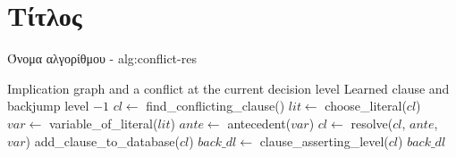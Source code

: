 \section{Τίτλος}

\begin{myalgorithm}{Όνομα αλγορίθμου - }{alg:conflict-res}
\begin{algorithmic}[1]
    \Require Implication graph and a conflict at the current decision level
    \Ensure Learned clause and backjump level
            \State \Return $-1$
        \EndIf
        \State $cl \gets$ find\_conflicting\_clause()
            \State $lit \gets$ choose\_literal($cl$)
            \State $var \gets$ variable\_of\_literal($lit$)
            \State $ante \gets$ antecedent($var$)
            \State $cl \gets$ resolve($cl$, $ante$, $var$)
        \EndWhile
        \State add\_clause\_to\_database($cl$)
        \State $back\_dl \gets$ clause\_asserting\_level($cl$)
        \State \Return $back\_dl$
    \EndFunction
    \end{algorithmic}
\end{myalgorithm}

